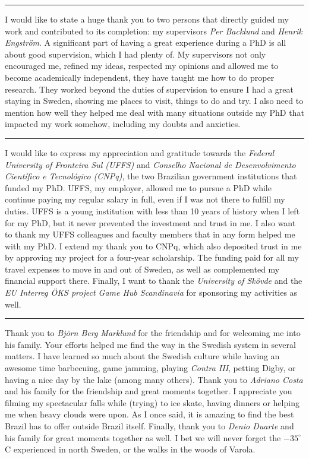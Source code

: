 \vspace{7pt}\hrule\vspace{5pt}

I would like to state a huge thank you to two persons that directly guided my work and contributed to its completion: my supervisors \textit{Per Backlund} and \textit{Henrik Engstr{\"o}m}. A significant part of having a great experience during a PhD is all about good supervision, which I had plenty of. My supervisors not only encouraged me, refined my ideas, respected my opinions and allowed me to become academically independent, they have taught me how to do proper research. They worked beyond the duties of supervision to ensure I had a great staying in Sweden, showing me places to visit, things to do and try. I also need to mention how well they helped me deal with many situations outside my PhD that impacted my work somehow, including my doubts and anxieties.

\vspace{7pt}\hrule\vspace{5pt}

I would like to express my appreciation and gratitude towards the \textit{Federal University of Fronteira Sul (UFFS)} and \textit{Conselho Nacional de Desenvolvimento Cient\'{i}fico e Tecnol\'{o}gico (CNPq)}, the two Brazilian government institutions that funded my PhD. UFFS, my employer, allowed me to pursue a PhD while continue paying my regular salary in full, even if I was not there to fulfill my duties. UFFS is a young institution with less than 10 years of history when I left for my PhD, but it never prevented the investment and trust in me. I also want to thank my UFFS colleagues and faculty members that in any form helped me with my PhD. I extend my thank you to CNPq, which also deposited trust in me by approving my project for a four-year scholarship. The funding paid for all my travel expenses to move in and out of Sweden, as well as complemented my financial support there. Finally, I want to thank the \textit{University of Sk\"ovde} and the \textit{EU Interreg \"OKS project Game Hub Scandinavia} for sponsoring my activities as well.

\vspace{7pt}\hrule\vspace{5pt}

Thank you to \textit{Bj{\"o}rn Berg Marklund} for the friendship and for welcoming me into his family. Your efforts helped me find the way in the Swedish system in several matters. I have learned so much about the Swedish culture while having an awesome time barbecuing, game jamming, playing \textit{Contra III}, petting Digby, or having a nice day by the lake (among many others). Thank you to \textit{Adriano Costa} and his family for the friendship and great moments together. I appreciate you filming my spectacular falls while (trying) to ice skate, having dinners or helping me when heavy clouds were upon. As I once said, it is amazing to find the best Brazil has to offer outside Brazil itself. Finally, thank you to \textit{Denio Duarte} and his family for great moments together as well. I bet we will never forget the $-35^{\circ}$C experienced in north Sweden, or the walks in the woods of Varola.

